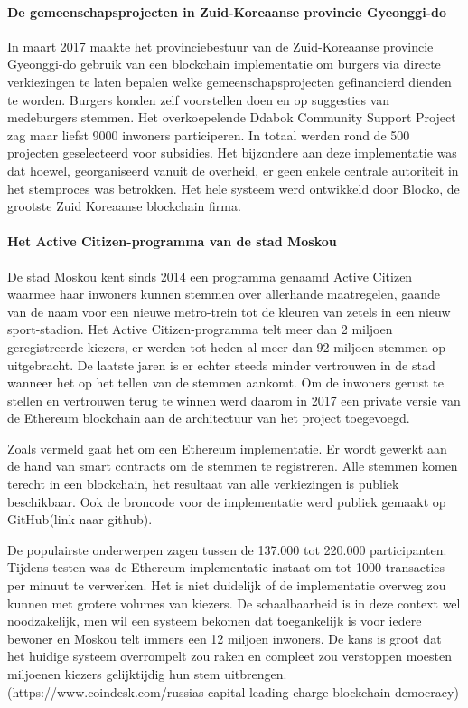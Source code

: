 				\paragraph{De gemeenschapsprojecten in Zuid-Koreaanse provincie Gyeonggi-do}
				In maart 2017 maakte het provinciebestuur van de Zuid-Koreaanse provincie Gyeonggi-do gebruik van een blockchain implementatie om burgers via directe verkiezingen te laten  bepalen welke gemeenschapsprojecten gefinancierd dienden te worden. Burgers konden zelf voorstellen doen en op suggesties van medeburgers stemmen. Het overkoepelende Ddabok Community Support Project zag maar liefst 9000 inwoners participeren. In totaal werden rond de 500  projecten geselecteerd voor subsidies. Het bijzondere aan deze implementatie was dat hoewel, georganiseerd vanuit de overheid, er geen enkele centrale autoriteit in het stemproces was betrokken. Het hele systeem werd ontwikkeld door Blocko, de grootste Zuid Koreaanse blockchain firma. ~\autocite{Kshetri2018}
				
				\paragraph{Het Active Citizen-programma van de stad Moskou}
				De stad Moskou kent sinds 2014 een programma genaamd Active Citizen waarmee haar inwoners  kunnen stemmen over allerhande maatregelen, gaande van de naam voor een nieuwe metro-trein tot de kleuren van zetels in een nieuw sport-stadion. Het Active Citizen-programma telt meer dan 2 miljoen geregistreerde kiezers, er werden tot heden al meer dan 92 miljoen stemmen op uitgebracht. De laatste jaren is er echter steeds minder vertrouwen in de stad wanneer het op het tellen van de stemmen aankomt. Om de inwoners gerust te stellen en vertrouwen terug te winnen werd  daarom in 2017 een private versie van de Ethereum blockchain aan de architectuur van het project toegevoegd. ~\autocite{Kshetri2018}
				
				Zoals vermeld gaat het om een Ethereum implementatie. Er wordt gewerkt aan de hand van smart contracts om de stemmen te registreren. Alle stemmen komen terecht in een  blockchain, het resultaat van alle verkiezingen is publiek beschikbaar. Ook de broncode voor de implementatie werd publiek gemaakt op GitHub(link naar github).
				
				De populairste onderwerpen zagen tussen de 137.000 tot 220.000 participanten. Tijdens testen was de  Ethereum implementatie  instaat om tot 1000 transacties per minuut te verwerken. Het is niet duidelijk of de implementatie overweg zou kunnen met  grotere volumes van kiezers. De schaalbaarheid is in deze context wel noodzakelijk, men wil een systeem bekomen dat toegankelijk is voor iedere bewoner en Moskou telt immers een 12 miljoen inwoners. De kans is groot dat het huidige systeem overrompelt zou raken en compleet zou verstoppen moesten miljoenen kiezers gelijktijdig hun stem uitbrengen.(https://www.coindesk.com/russias-capital-leading-charge-blockchain-democracy)
				
